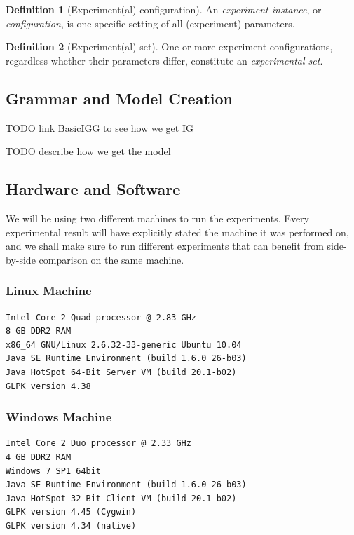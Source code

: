\documentclass[a4paper,12pt,oneside]{report}
\theoremstyle{definition}
\newtheorem{define}{Definition}[chapter]
\begin{document}
\begin{define}[Experiment(al) configuration]
	\label{define-experiment-config}
	An \textit{experiment instance}, or \textit{configuration}, is one specific setting of all (experiment) parameters.
\end{define}

\begin{define}[Experiment(al) set]
	\label{define-experiment-set}
	One or more experiment configurations, regardless whether their parameters differ, constitute an \textit{experimental set}.
\end{define}

\subsection{Grammar and Model Creation}

TODO link BasicIGG to see how we get IG

TODO describe how we get the model

\subsection{Hardware and Software}

We will be using two different machines to run the experiments. Every experimental result will have explicitly stated the machine it was performed on, and we shall make sure to run different experiments that can benefit from side-by-side comparison on the same machine.

\subsubsection{Linux Machine}

\begin{verbatim}
Intel Core 2 Quad processor @ 2.83 GHz
8 GB DDR2 RAM
x86_64 GNU/Linux 2.6.32-33-generic Ubuntu 10.04
Java SE Runtime Environment (build 1.6.0_26-b03)
Java HotSpot 64-Bit Server VM (build 20.1-b02)
GLPK version 4.38
\end{verbatim}

\subsubsection{Windows Machine}

\begin{verbatim}
Intel Core 2 Duo processor @ 2.33 GHz
4 GB DDR2 RAM
Windows 7 SP1 64bit
Java SE Runtime Environment (build 1.6.0_26-b03)
Java HotSpot 32-Bit Client VM (build 20.1-b02)
GLPK version 4.45 (Cygwin)
GLPK version 4.34 (native)
\end{verbatim}
\end{document}

